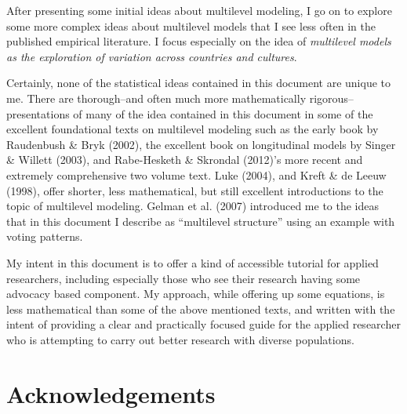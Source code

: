 \documentclass[
  letterpaper,
  DIV=11,
  numbers=noendperiod]{scrreprt}
\begin{document}
After presenting some initial ideas about multilevel modeling, I go on
to explore some more complex ideas about multilevel models that I see
less often in the published empirical literature. I focus especially on
the idea of \emph{multilevel models as the exploration of variation
across countries and cultures}.

Certainly, none of the statistical ideas contained in this document are
unique to me. There are thorough--and often much more mathematically
rigorous--presentations of many of the idea contained in this document
in some of the excellent foundational texts on multilevel modeling such
as the early book by Raudenbush \& Bryk (2002), the excellent book on
longitudinal models by Singer \& Willett (2003), and Rabe-Hesketh \&
Skrondal (2012)'s more recent and extremely comprehensive two volume
text. Luke (2004), and Kreft \& de Leeuw (1998), offer shorter, less
mathematical, but still excellent introductions to the topic of
multilevel modeling. Gelman et al. (2007) introduced me to the ideas
that in this document I describe as ``multilevel structure'' using an
example with voting patterns.

My intent in this document is to offer a kind of accessible tutorial for
applied researchers, including especially those who see their research
having some advocacy based component. My approach, while offering up
some equations, is less mathematical than some of the above mentioned
texts, and written with the intent of providing a clear and practically
focused guide for the applied researcher who is attempting to carry out
better research with diverse populations.


\hypertarget{acknowledgements}{%
\chapter*{Acknowledgements}\label{acknowledgements}}

\end{document}
